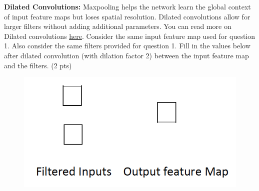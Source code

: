 \textbf{Dilated Convolutions:} Maxpooling helps the network learn the global context of input feature maps but loses spatial resolution. Dilated convolutions allow for larger filters without adding additional parameters.  You can read more on Dilated convolutions \href{https://towardsdatascience.com/review-dilated-convolution-semantic-segmentation-9d5a5bd768f5}{here}. Consider the same input feature map used for question 1. Also consider the same filters provided for question 1. Fill in the values below after dilated convolution (with dilation factor 2) between the input feature map and the filters. (2 pts)

\begin{figure}[H]
	\centering
	\includegraphics[width=.3\linewidth]{images/dilatedconv.png}
\end{figure}

\begin{tcolorbox}[title=Solution]
\end{tcolorbox}
